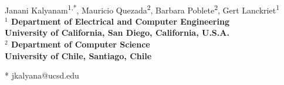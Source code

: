 \documentclass[10pt,letterpaper]{article}
\date{}
\begin{document}
\vspace*{0.35in}

\begin{flushleft}
{\Large
\textbf{}
}
\newline
\\
Janani Kalyanam\textsuperscript{1,*},
Mauricio Quezada\textsuperscript{2},
Barbara Poblete\textsuperscript{2},
Gert Lanckriet\textsuperscript{1}
\\
\bigskip
\bf{$^1$} Department of Electrical and Computer Engineering \\ University of California, San Diego, California, U.S.A.
\\
\bf{$^2$} Department of Computer Science \\ University of Chile, Santiago, Chile
\\
\bigskip

% 
%





* jkalyana@ucsd.edu

\end{flushleft}
\end{document}
